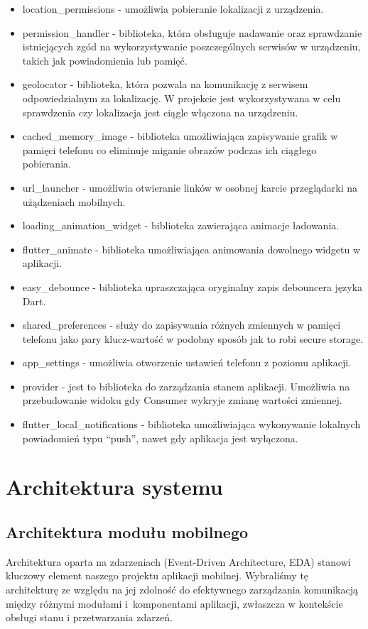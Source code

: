 \documentclass[a4paper,twoside,12pt]{book}
\begin{document}
\begin{itemize}
    \item location\_permissions - umożliwia pobieranie lokalizacji z urządzenia. 
    \item permission\_handler - biblioteka, która obsługuje nadawanie oraz sprawdzanie istniejących zgód na wykorzystywanie poszczególnych serwisów w urządzeniu, takich jak powiadomienia lub pamięć. 
    \item geolocator - biblioteka, która pozwala na komunikację z serwisem odpowiedzialnym za lokalizację. W projekcie jest wykorzystywana w celu sprawdzenia czy lokalizacja jest ciągle włączona na urządzeniu. 
    \item cached\_memory\_image - biblioteka umożliwiająca zapisywanie grafik w pamięci telefonu co eliminuje miganie obrazów podczas ich ciągłego pobierania.
    \item url\_launcher - umożliwia otwieranie linków w osobnej karcie przeglądarki na użądzeniach mobilnych. 
    \item loading\_animation\_widget - biblioteka zawierająca animacje ładowania.
    \item flutter\_animate - biblioteka umożliwiająca animowania dowolnego widgetu w aplikacji.
    \item easy\_debounce - biblioteka upraszczająca oryginalny zapis debouncera języka Dart. 
    \item shared\_preferences - służy do zapisywania różnych zmiennych w pamięci telefonu jako pary klucz-wartość w podobny sposób jak to robi secure storage. 
    \item app\_settings - umożliwia otworzenie ustawień telefonu z poziomu aplikacji.
    \item provider - jest to biblioteka do zarządzania stanem aplikacji. Umożliwia na przebudowanie widoku gdy Consumer wykryje zmianę wartości zmiennej.
    \item flutter\_local\_notifications - biblioteka umożliwiająca wykonywanie lokalnych powiadomień typu ``push'', nawet gdy aplikacja jest wyłączona. 
\end{itemize}
\section{Architektura systemu}
\subsection{Architektura modułu mobilnego}
Architektura oparta na zdarzeniach (Event-Driven Architecture, EDA) stanowi kluczowy element naszego projektu aplikacji mobilnej. Wybraliśmy tę architekturę ze względu na jej zdolność do efektywnego zarządzania komunikacją między różnymi modułami i~komponentami aplikacji, zwłaszcza w kontekście obsługi stanu i przetwarzania zdarzeń.
\end{document}
